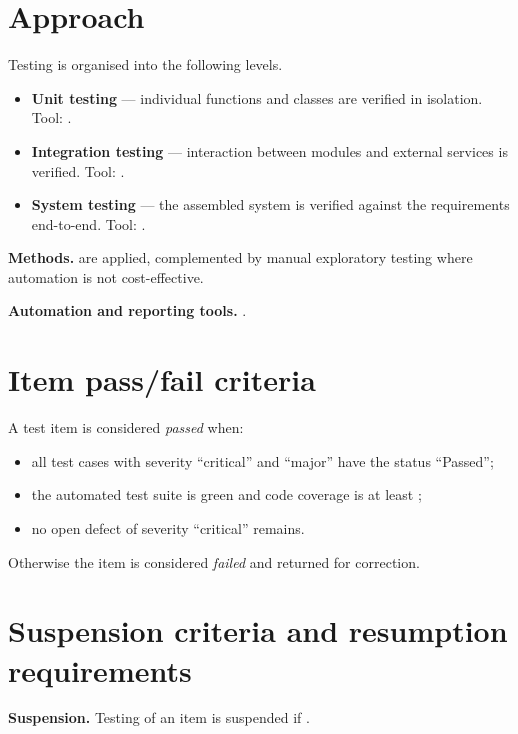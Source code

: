 \documentclass[12pt,a4paper]{extarticle}
\begin{document}
\section{Approach}
Testing is organised into the following levels.
\begin{itemize}
\item \textbf{Unit testing} --- individual functions and classes are verified in isolation. Tool: .
\item \textbf{Integration testing} --- interaction between modules and external services is verified. Tool: .
\item \textbf{System testing} --- the assembled system is verified against the requirements end-to-end. Tool: .
\end{itemize}

\textbf{Methods.}  are applied, complemented by manual exploratory testing where automation is not cost-effective.

\textbf{Automation and reporting tools.} .

\section{Item pass/fail criteria}
A test item is considered \emph{passed} when:
\begin{itemize}
\item all test cases with severity \enquote{critical} and \enquote{major} have the status \enquote{Passed};
\item the automated test suite is green and code coverage is at least ;
\item no open defect of severity \enquote{critical} remains.
\end{itemize}
Otherwise the item is considered \emph{failed} and returned for correction.

\section{Suspension criteria and resumption requirements}
\textbf{Suspension.} Testing of an item is suspended if .
\end{document}
